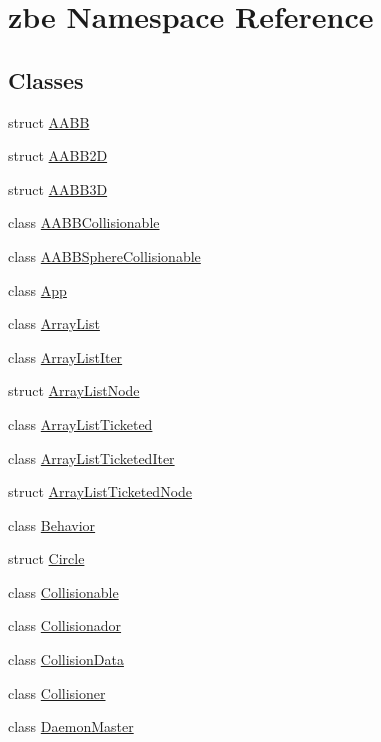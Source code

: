\hypertarget{namespacezbe}{}\section{zbe Namespace Reference}
\label{namespacezbe}
\subsection*{Classes}
\begin{DoxyCompactItemize}
\item 
struct \hyperlink{structzbe_1_1_a_a_b_b}{A\+A\+B\+B}
\item 
struct \hyperlink{structzbe_1_1_a_a_b_b2_d}{A\+A\+B\+B2\+D}
\item 
struct \hyperlink{structzbe_1_1_a_a_b_b3_d}{A\+A\+B\+B3\+D}
\item 
class \hyperlink{classzbe_1_1_a_a_b_b_collisionable}{A\+A\+B\+B\+Collisionable}
\item 
class \hyperlink{classzbe_1_1_a_a_b_b_sphere_collisionable}{A\+A\+B\+B\+Sphere\+Collisionable}
\item 
class \hyperlink{classzbe_1_1_app}{App}
\item 
class \hyperlink{classzbe_1_1_array_list}{Array\+List}
\item 
class \hyperlink{classzbe_1_1_array_list_iter}{Array\+List\+Iter}
\item 
struct \hyperlink{structzbe_1_1_array_list_node}{Array\+List\+Node}
\item 
class \hyperlink{classzbe_1_1_array_list_ticketed}{Array\+List\+Ticketed}
\item 
class \hyperlink{classzbe_1_1_array_list_ticketed_iter}{Array\+List\+Ticketed\+Iter}
\item 
struct \hyperlink{structzbe_1_1_array_list_ticketed_node}{Array\+List\+Ticketed\+Node}
\item 
class \hyperlink{classzbe_1_1_behavior}{Behavior}
\item 
struct \hyperlink{structzbe_1_1_circle}{Circle}
\item 
class \hyperlink{classzbe_1_1_collisionable}{Collisionable}
\item 
class \hyperlink{classzbe_1_1_collisionador}{Collisionador}
\item 
class \hyperlink{classzbe_1_1_collision_data}{Collision\+Data}
\item 
class \hyperlink{classzbe_1_1_collisioner}{Collisioner}
\item 
class \hyperlink{classzbe_1_1_daemon_master}{Daemon\+Master}

\end{DoxyCompactItemize}
